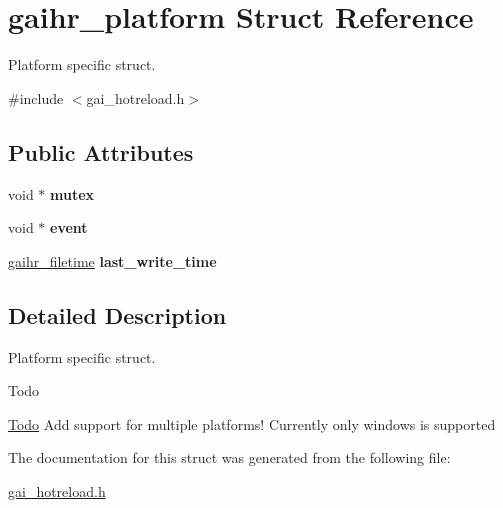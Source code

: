 \hypertarget{structgaihr__platform}{}\section{gaihr\+\_\+platform Struct Reference}
\label{structgaihr__platform}


Platform specific struct.  




{\ttfamily \#include $<$gai\+\_\+hotreload.\+h$>$}

\subsection*{Public Attributes}
\begin{DoxyCompactItemize}
\item 
\mbox{\label{structgaihr__platform_aedfb9de8ef3e57899ffdb423797ee38c}} 
void $\ast$ {\bfseries mutex}
\item 
\mbox{\label{structgaihr__platform_a632f16efa0c26719b6a05f4fbe4a1de7}} 
void $\ast$ {\bfseries event}
\item 
\mbox{\label{structgaihr__platform_a4c81c9ef96c25e2ded0824debe0a77ab}} 
\hyperlink{structgaihr__filetime}{gaihr\+\_\+filetime} {\bfseries last\+\_\+write\+\_\+time}
\end{DoxyCompactItemize}


\subsection{Detailed Description}
Platform specific struct. 

\begin{DoxyRefDesc}{Todo}
\item[\hyperlink{todo__todo000001}{Todo}]Add support for multiple platforms! Currently only windows is supported \end{DoxyRefDesc}


The documentation for this struct was generated from the following file\+:\begin{DoxyCompactItemize}
\item 
\hyperlink{gai__hotreload_8h}{gai\+\_\+hotreload.\+h}\end{DoxyCompactItemize}
